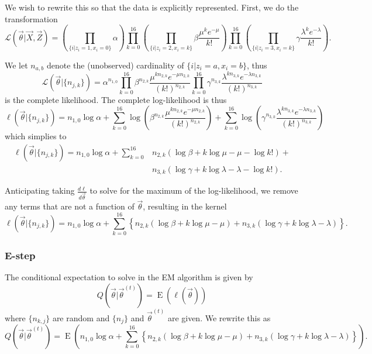 \documentclass[
]{article}
\begin{document}
We wish to rewrite this so that the data is explicitly represented.
First, we do the transformation \[
  \mathcal{L}(\vec{\theta} | \vec{X}, \vec{Z}) =
    \left(\prod_{\{i | z_i = 1, x_i = 0 \}} \alpha\right)
    \prod_{k=0}^{16} \left(\prod_{\{i | z_i = 2, x_i = k\}} \beta \frac{\mu^{k} e^{-\mu}}{k!}\right)
    \prod_{k=0}^{16} \left(\prod_{\{i | z_i = 3, x_i = k\}} \gamma \frac{\lambda^{k} e^{-\lambda}}{k!}\right).
\]

We let \(n_{a,b}\) denote the (unobserved) cardinality of
\(\{i | z_i = a, x_i = b\}\), thus \[
  \mathcal{L}(\vec{\theta} | \{n_{j,k}\}) =
    \alpha^{n_{1,0}}
    \prod_{k=0}^{16} \beta^{n_{2,k}} \frac{\mu^{k n_{2,k}} e^{-\mu n_{2,k}}}{(k!)^{n_{2,k}}}
    \prod_{k=0}^{16} \gamma^{n_{3,k}} \frac{\lambda^{k n_{3,k}} e^{-\lambda n_{3,k}}}{(k!)^{n_{3,k}}}
\] is the complete likelihood. The complete log-likelihood is thus \[
  \ell(\vec{\theta} | \{n_{j,k}\}) =
    n_{1,0} \log \alpha +
    \sum_{k=0}^{16} \log \left(\beta^{n_{2,k}} \frac{\mu^{k n_{2,k}} e^{-\mu n_{2,k}}}{(k!)^{n_{2,k}}}\right) +
    \sum_{k=0}^{16} \log \left(\gamma^{n_{3,k}} \frac{\lambda^{k n_{3,k}} e^{-\lambda n_{3,k}}}{(k!)^{n_{3,k}}}\right)
\] which simplies to \begin{equation}
\begin{split}
  \ell(\vec{\theta} | \{n_{j,k}\}) =
    n_{1,0} \log \alpha +
    \sum_{k=0}^{16}
      &n_{2,k}(\log \beta + k \log \mu - \mu - \log k!) + \\
      &n_{3,k}(\log \gamma + k \log \lambda - \lambda - \log k!).
\end{split}
\end{equation}

Anticipating taking \(\frac{d \ell}{d \vec{\theta}}\) to solve for the
maximum of the log-likelihood, we remove any terms that are not a
function of \(\vec{\theta}\), resulting in the kernel \[
  \ell(\vec{\theta} | \{n_{j,k}\}) = n_{1,0} \log \alpha +
    \sum_{k=0}^{16} \left\{ n_{2,k}(\log \beta + k \log \mu - \mu) + n_{3,k}(\log \gamma + k \log \lambda - \lambda) \right\}.
\]

\hypertarget{e-step-1}{%
\subsubsection{E-step}\label{e-step-1}}

The conditional expectation to solve in the EM algorithm is given by \[
  Q(\vec{\theta} | \vec{\theta}^{(t)}) = \operatorname{E}(\ell(\vec{\theta}))
\] where \(\{n_{k,j}\}\) are random and \(\{n_j\}\) and
\(\vec{\theta}^{(t)}\) are given. We rewrite this as \[
Q(\vec{\theta} | \vec{\theta}^{(t)}) = \operatorname{E}
  \left(
      n_{1,0} \log \alpha +
      \sum_{k=0}^{16} \left\{
        n_{2,k}(\log \beta + k \log \mu - \mu) +
        n_{3,k}(\log \gamma + k \log \lambda - \lambda)
        \right\}
  \right).
\]
\end{document}
